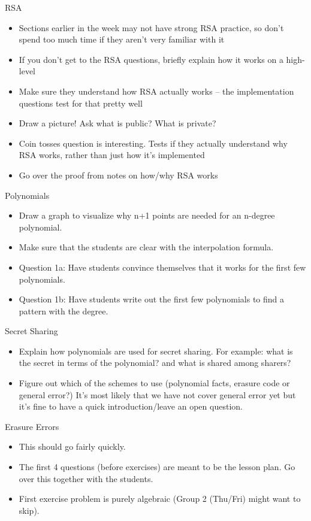 \documentclass{exam}
\begin{document}
\begin{questions}
	\item RSA
	\begin{itemize}
		\item Sections earlier in the week may not have strong RSA practice, so don’t spend too much time if they aren’t very familiar with it
		\item If you don’t get to the RSA questions, briefly explain how it works on a high-level
		\item Make sure they understand how RSA actually works – the implementation questions test for that pretty well
		\item Draw a picture! Ask what is public? What is private?
		\item Coin tosses question is interesting. Tests if they actually understand why RSA works, rather than just how it’s implemented
		\item Go over the proof from notes on how/why RSA works
	\end{itemize}


	\item Polynomials
	\begin{itemize}
		\item Draw a graph to visualize why n+1 points are needed for an n-degree polynomial.
		\item Make sure that the students are clear with the interpolation formula.
		\item Question 1a: Have students convince themselves that it works for the first few polynomials.
		\item Question 1b: Have students write out the first few polynomials to find a pattern with the degree.
	\end{itemize}

	\item Secret Sharing
	\begin{itemize}
		\item Explain how polynomials are used for secret sharing. For example: what is the secret in terms of the polynomial? and what is shared among sharers?
		\item Figure out which of the schemes to use (polynomial facts, erasure code or general error?) It's most likely that we have not cover general error yet but it's fine to have a quick introduction/leave an open question.
	\end{itemize}


	\item Erasure Errors
	\begin{itemize}
		\item This should go fairly quickly.
		\item The first 4 questions (before exercises) are meant to be the lesson plan. Go over this together with the students.
		\item First exercise problem is purely algebraic (Group 2 (Thu/Fri) might want to skip).
	\end{itemize}
\end{questions}
\end{document}
